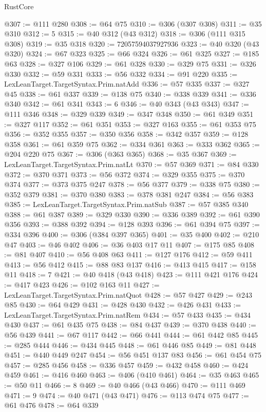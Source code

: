 \begin{lexlean}{RustCore}
\begin{coremodule}
@307 := @111 @280
@308 := @64 @75
@310 := @306 (@307 @308)
@311 := @35 @310
@312 := 5
@315 := @40 @312 (@43 @312)
@318 := @306 (@111 @315 @308)
@319 := @35 @318
@320 := 72057594037927936
@323 := @40 @320 (@43 @320)
@324 := @67 @323
@325 := @66 @324
@326 := @61 @325
@327 := @185 @63
@328 := @327 @106
@329 := @61 @328
@330 := @329 @75
@331 := @326 @330
@332 := @59 @331
@333 := @56 @332
@334 := @91 @220
@335 := LexLeanTarget.TargetSyntax.Prim.natAdd
@336 := @57 @335
@337 := @327 @45
@338 := @61 @337
@339 := @138 @75
@340 := @338 @339
@341 := @336 @340
@342 := @61 @341
@343 := 6
@346 := @40 @343 (@43 @343)
@347 := @111 @346
@348 := @329 @339
@349 := @347 @348
@350 := @61 @349
@351 := @327 @117
@352 := @61 @351
@353 := @327 @163
@355 := @61 @353 @75
@356 := @352 @355
@357 := @350 @356
@358 := @342 @357
@359 := @128 @358
@361 := @61 @359 @75
@362 := @334 @361
@363 := @333 @362
@365 := @204 @220 @75
@367 := @306 (@363 @365)
@368 := @35 @367
@369 := LexLeanTarget.TargetSyntax.Prim.natLt
@370 := @57 @369
@371 := @84 @330
@372 := @370 @371
@373 := @56 @372
@374 := @329 @355
@375 := @370 @374
@377 := @373 @375 @247
@378 := @56 @377
@379 := @338 @75
@380 := @352 @379
@381 := @370 @380
@383 := @378 @381 @247
@384 := @56 @383
@385 := LexLeanTarget.TargetSyntax.Prim.natSub
@387 := @57 @385 @340
@388 := @61 @387
@389 := @329 @330
@390 := @336 @389
@392 := @61 @390 @356
@393 := @388 @392
@394 := @128 @393
@396 := @61 @394 @75
@397 := @334 @396
@400 := @306 (@384 @397 @365)
@401 := @35 @400
@402 := @210 @47
@403 := @46 @402
@406 := @36 @403 @17 @11
@407 := @175 @85
@408 := @81 @407
@410 := @56 @408 @63
@411 := @127 @176
@412 := @59 @411
@413 := @56 @412
@415 := @88 @83 @137
@416 := @413 @415
@417 := @158 @11
@418 := 7
@421 := @40 @418 (@43 @418)
@423 := @111 @421 @176
@424 := @417 @423
@426 := @102 @163 @11
@427 := LexLeanTarget.TargetSyntax.Prim.natQuot
@428 := @57 @427
@429 := @243 @85
@430 := @64 @429
@431 := @428 @430
@432 := @426 @431
@433 := LexLeanTarget.TargetSyntax.Prim.natRem
@434 := @57 @433
@435 := @434 @430
@437 := @61 @435 @75
@438 := @84 @437
@439 := @370 @438
@440 := @56 @439
@441 := @67 @117
@442 := @66 @441
@444 := @61 @442 @85
@445 := @285 @444
@446 := @434 @445
@448 := @61 @446 @85
@449 := @81 @448
@451 := @440 @449 @247
@454 := @56 @451 @137 @83
@456 := @61 @454 @75
@457 := @285 @456
@458 := @336 @457
@459 := @432 @458
@460 := @424 @459
@461 := @416 @460
@463 := @406 (@410 @461)
@464 := @35 @463
@465 := @50 @11
@466 := 8
@469 := @40 @466 (@43 @466)
@470 := @111 @469
@471 := 9
@474 := @40 @471 (@43 @471)
@476 := @113 @474 @75
@477 := @61 @476
@478 := @64 @339

\end{coremodule}
\end{lexlean}

